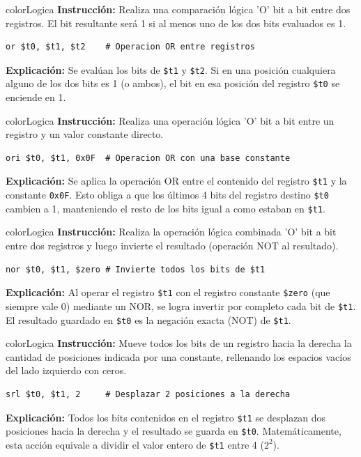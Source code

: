 \documentclass[12pt,a4paper]{article}
\begin{document}
\begin{instructionBox}[17. OR (O Lógico)]{colorLogica}
\textbf{Instrucción:} Realiza una comparación lógica 'O' bit a bit entre dos registros. El bit resultante será 1 si al menos uno de los dos bits evaluados es 1.
\begin{lstlisting}
or $t0, $t1, $t2    # Operacion OR entre registros
\end{lstlisting}
\textbf{Explicación:} Se evalúan los bits de \texttt{\$t1} y \texttt{\$t2}. Si en una posición cualquiera alguno de los dos bits es 1 (o ambos), el bit en esa posición del registro \texttt{\$t0} se enciende en 1.
\end{instructionBox}

\begin{instructionBox}{colorLogica}
\textbf{Instrucción:} Realiza una operación lógica 'O' bit a bit entre un registro y un valor constante directo.
\begin{lstlisting}
ori $t0, $t1, 0x0F  # Operacion OR con una base constante  
\end{lstlisting}
\textbf{Explicación:} Se aplica la operación OR entre el contenido del registro \texttt{\$t1} y la constante \texttt{0x0F}. Esto obliga a que los últimos 4 bits del registro destino \texttt{\$t0} cambien a 1, manteniendo el resto de los bits igual a como estaban en \texttt{\$t1}.
\end{instructionBox}

\begin{instructionBox}{colorLogica}
\textbf{Instrucción:} Realiza la operación lógica combinada 'O' bit a bit entre dos registros y luego invierte el resultado (operación NOT al resultado).
\begin{lstlisting}
nor $t0, $t1, $zero # Invierte todos los bits de $t1
\end{lstlisting}
\textbf{Explicación:} Al operar el registro \texttt{\$t1} con el registro constante \texttt{\$zero} (que siempre vale 0) mediante un NOR, se logra invertir por completo cada bit de \texttt{\$t1}. El resultado guardado en \texttt{\$t0} es la negación exacta (NOT) de \texttt{\$t1}.
\end{instructionBox}

\begin{instructionBox}{colorLogica}
\textbf{Instrucción:} Mueve todos los bits de un registro hacia la derecha la cantidad de posiciones indicada por una constante, rellenando los espacios vacíos del lado izquierdo con ceros.
\begin{lstlisting}
srl $t0, $t1, 2     # Desplazar 2 posiciones a la derecha
\end{lstlisting}
\textbf{Explicación:} Todos los bits contenidos en el registro \texttt{\$t1} se desplazan dos posiciones hacia la derecha y el resultado se guarda en \texttt{\$t0}. Matemáticamente, esta acción equivale a dividir el valor entero de \texttt{\$t1} entre 4 ($2^2$).
\end{instructionBox}
\end{document}
